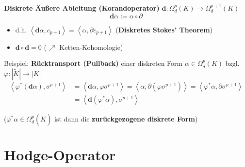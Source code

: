 \documentclass[handout]{beamer}
\renewcommand{\d}{\textbf{d}}
\begin{document}
  \begin{frame}
    \begin{block}{\textbf{Diskrete Äußere Ableitung (Korandoperator)} \( \d: \Omega_{d}^{p}(K) \longrightarrow \Omega_{d}^{p+1}(K) \)}
      \[ \d\alpha := \alpha\circ\partial \]
      \begin{itemize}
        \item d.h. \( \left\langle \d\alpha , c_{p+1} \right\rangle =  \left\langle \alpha , \partial c_{p+1} \right\rangle\) 
              \qquad(\textbf{Diskretes Stokes' Theorem})
        \pause
        \item \( \d\circ\d = 0 \) \qquad(\( \nearrow \) Ketten-Kohomologie)
      \end{itemize}
    \end{block}
    \pause
    \begin{block}{Beispiel: \textbf{Rücktransport (Pullback)} einer diskreten Form \( \alpha\in\Omega_{d}^{p}(K)\) bzgl. \( \varphi:|\tilde{K}|\rightarrow |K| \)}
      \begin{align*}
        \left\langle \varphi^{*}(\d \alpha) , \sigma^{p+1} \right\rangle &= \left\langle \d \alpha , \varphi\sigma^{p+1} \right\rangle
                                                                          = \left\langle \alpha , \partial(\varphi\sigma^{p+1}) \right\rangle
                                                                          =  \left\langle \varphi^{*}\alpha , \partial\sigma^{p+1} \right\rangle \\
                                                                         &= \left\langle \d(\varphi^{*}\alpha) , \sigma^{p+1} \right\rangle
      \end{align*}
    \end{block}
    (\( \varphi^{*}\alpha \in \Omega_{d}^{p}(\tilde{K}) \) ist dann die \textbf{zurückgezogene diskrete Form})
  \end{frame}




  \section{Hodge-Operator}
\end{document}
